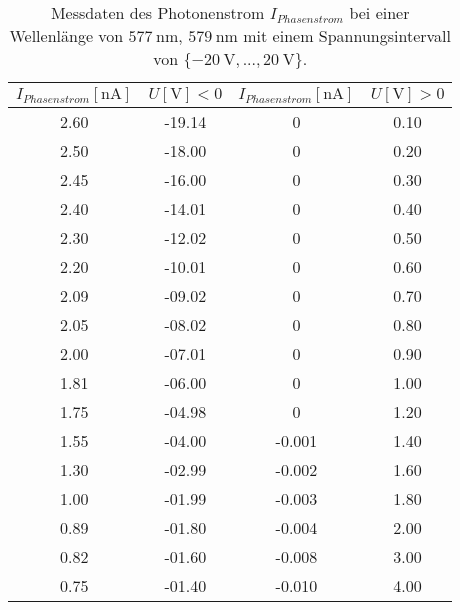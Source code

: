 \begin{table}
    \centering
    \caption{Messdaten des Photonenstrom $I_{Phasenstrom}$ bei einer Wellenlänge von $\SI{577}{\nano\meter}$, $\SI{579}{\nano\meter}$ mit einem Spannungsintervall von $\{\SI{-20}{\volt},... ,\SI{20}{\volt}\}$.}
    \label{tab:tab1}
    \begin{tabular}{c c || c c}
        \toprule
        $I_{Phasenstrom}[\si{\nano\ampere}]$ & $U [\si{\volt}] < 0$ & $I_{Phasenstrom}[\si{\nano\ampere}]$ & $U [\si{\volt}] > 0$ \\
        \midrule
        2.60         &         -19.14  &  0            &           0.10    \\    
        2.50         &         -18.00  &  0            &           0.20    \\    
        2.45         &         -16.00  &  0            &           0.30    \\    
        2.40         &         -14.01  &  0            &           0.40    \\    
        2.30         &         -12.02  &  0            &           0.50    \\    
        2.20         &         -10.01  &  0            &           0.60    \\    
        2.09         &         -09.02  &  0            &           0.70    \\    
        2.05         &         -08.02  &  0            &           0.80    \\    
        2.00         &         -07.01  &  0            &           0.90    \\    
        1.81         &         -06.00  &  0            &           1.00    \\    
        1.75         &         -04.98  &  0            &           1.20    \\    
        1.55         &         -04.00  &  -0.001       &           1.40    \\    
        1.30         &         -02.99  &  -0.002       &           1.60    \\    
        1.00         &         -01.99  &  -0.003       &           1.80    \\    
        0.89         &         -01.80  &  -0.004       &           2.00    \\    
        0.82         &         -01.60  &  -0.008       &           3.00    \\    
        0.75         &         -01.40  &  -0.010       &           4.00    \\    

\end{tabular}
\end{table}
